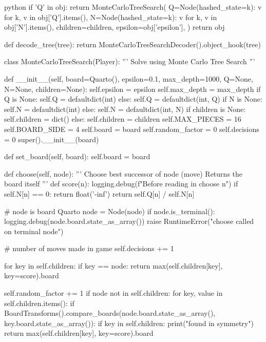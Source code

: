 \begin{mintedbox}{python}
        if 'Q' in obj:
            return MonteCarloTreeSearch(
                Q={Node(hashed_state=k): v for k, v in obj['Q'].items()},
                N={Node(hashed_state=k): v for k, v in obj['N'].items()},
                children=children,
                epsilon=obj['epsilon'],
            )
        return obj


def decode_tree(tree):
    return MonteCarloTreeSearchDecoder().object_hook(tree)


class MonteCarloTreeSearch(Player):
    '''
    Solve using Monte Carlo Tree Search
    '''

    def __init__(self, board=Quarto(), epsilon=0.1, max_depth=1000, Q=None, N=None, children=None):
        self.epsilon = epsilon
        self.max_depth = max_depth
        if Q is None:
            self.Q = defaultdict(int)
        else:
            self.Q = defaultdict(int, Q)
        if N is None:
            self.N = defaultdict(int)
        else:
            self.N = defaultdict(int, N)
        if children is None:
            self.children = dict()
        else:
            self.children = children
        self.MAX_PIECES = 16
        self.BOARD_SIDE = 4
        self.board = board
        self.random_factor = 0
        self.decisions = 0
        super().__init__(board)

    def set_board(self, board):
        self.board = board

    def choose(self, node):
        '''
        Choose best successor of node (move)
        Returns the board itself
        '''
        def score(n):
            logging.debug(f"Before reading in choose {n}")
            if self.N[n] == 0:
                return float('-inf')
            return self.Q[n] / self.N[n]

        # node is board Quarto
        node = Node(node)
        if node.is_terminal():
            logging.debug(node.board.state_as_array())
            raise RuntimeError("choose called on terminal node")

        # number of moves made in game
        self.decisions += 1

        for key in self.children:
            if key == node:
                return max(self.children[key], key=score).board

        self.random_factor += 1
        if node not in self.children:
            for key, value in self.children.items():
                if BoardTransforms().compare_boards(node.board.state_as_array(), key.board.state_as_array()):
                    if key in self.children:
                        print("found in symmetry")
                        return max(self.children[key], key=score).board


\end{mintedbox}
